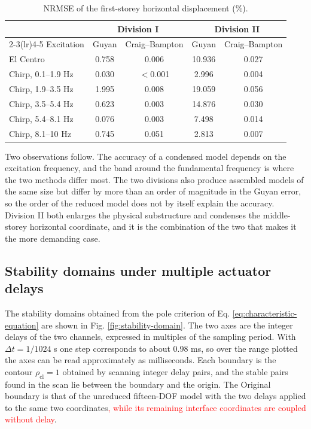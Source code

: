 \documentclass[11pt,a4paper]{article}
\numberwithin{equation}{section}
\newcommand{\rev}[1]{\textcolor{red}{#1}}
\begin{document}
\begin{table}[htbp]
	\centering
	\caption{NRMSE of the first-storey horizontal displacement (\%).}
	\label{tab:nrmse}
	\begin{tabular}{lcccc}
		\toprule
		& \multicolumn{2}{c}{Division I} & \multicolumn{2}{c}{Division II}\\
		\cmidrule(lr){2-3}\cmidrule(lr){4-5}
		Excitation & Guyan & Craig--Bampton & Guyan & Craig--Bampton\\
		\midrule
		El Centro           & 0.758 & 0.006    & 10.936 & 0.027\\
		\midrule
		Chirp, 0.1--1.9 Hz  & 0.030 & $<$0.001 & 2.996  & 0.004\\
		Chirp, 1.9--3.5 Hz  & 1.995 & 0.008    & 19.059 & 0.056\\
		Chirp, 3.5--5.4 Hz  & 0.623 & 0.003    & 14.876 & 0.030\\
		Chirp, 5.4--8.1 Hz  & 0.076 & 0.003    & 7.498  & 0.014\\
		Chirp, 8.1--10 Hz   & 0.745 & 0.051    & 2.813  & 0.007\\
		\bottomrule
	\end{tabular}
\end{table}

Two observations follow. The accuracy of a condensed model depends on the excitation frequency, and the band around the fundamental frequency is where the two methods differ most. The two divisions also produce assembled models of the same size but differ by more than an order of magnitude in the Guyan error, so the order of the reduced model does not by itself explain the accuracy. Division II both enlarges the physical substructure and condenses the middle-storey horizontal coordinate, and it is the combination of the two that makes it the more demanding case.

\subsection{Stability domains under multiple actuator delays}
\label{sec:stability-domains}

The stability domains obtained from the pole criterion of Eq. \eqref{eq:characteristic-equation} are shown in Fig. \ref{fig:stability-domain}. The two axes are the integer delays of the two channels, expressed in multiples of the sampling period. With \(\Delta t=1/1024\) s one step corresponds to about 0.98 ms, so over the range plotted the axes can be read approximately as milliseconds. Each boundary is the contour \(\rho_{\mathrm{cl}}=1\) obtained by scanning integer delay pairs, and the stable pairs found in the scan lie between the boundary and the origin. The Original boundary is that of the unreduced fifteen-DOF model with the two delays applied to the same two coordinates\rev{, while its remaining interface coordinates are coupled without delay}.
\end{document}
